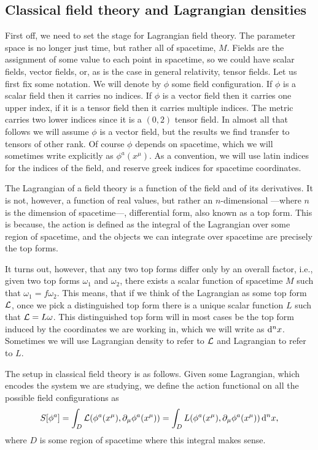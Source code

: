 \documentclass[../main.tex]{subfiles}
\begin{document}
\subsection{Classical field theory and Lagrangian densities}
First off, we need to set the stage for Lagrangian field theory. The parameter space is no
longer just time, but rather all of spacetime, \( M \). Fields are the assignment of some
value to each point in spacetime, so we could have scalar fields, vector fields, or, as is
the case in general relativity, tensor fields. Let us first fix some notation. We will
denote by \( \phi \) some field configuration. If \( \phi \) is a scalar field then it
carries no indices. If \( \phi \) is a vector field then it carries one upper index, if it is a
tensor field then it carries multiple indices. The metric carries two lower indices since
it is a \( (0,2) \) tensor field. In almost all that follows we will assume \( \phi \) is
a vector field, but the results we find transfer to tensors of other rank. Of
course \( \phi \) depends on spacetime, which we will sometimes write explicitly as \(
\phi^a(x^\mu) \). As a convention, we will use latin indices for the indices of the field,
and reserve greek indices for spacetime coordinates. 

The Lagrangian of a field theory is a function of the field and of its derivatives.
It is not, however, a function of real values, but rather an \( n \)-dimensional ---where
\( n \) is the dimension of spacetime---, differential form, also known as a top form.
This is because, the action is defined as the integral of the Lagrangian over some region
of spacetime, and the objects we can integrate over spacetime are precisely the top forms.

It turns out, however, that any two top forms differ only by an overall factor, i.e., given two
top forms \( \omega_1 \) and \( \omega_2 \), there exists a scalar function of spacetime
\( M \) such that \( \omega_1 = f\omega_2 \). This means, that if we think of the
Lagrangian as some top form \( \mathcal{L} \), once we pick a distinguished top form there is a
unique scalar function \( L \) such that \( \mathcal{L} = L \omega \). This distinguished top form
will in most cases be the top form induced by the coordinates we are working in, which we
will write as \( \mathrm{d}^nx \). Sometimes we will use Lagrangian density to refer to \( \mathcal{L} \)
and Lagrangian to refer to \( L \). 

The setup in classical field theory is as follows. Given some Lagrangian, which encodes
the system we are studying, we define the action functional on all the possible field
configurations as 
\begin{equation*}
	S[\phi^a] = \int_D \mathcal{L}(\phi^a(x^\mu), \partial_\mu \phi^a(x^\mu)) = \int_D
	L(\phi^a(x^\mu), \partial_\mu \phi^a(x^\mu)) \,\mathrm{d}^n x,
\end{equation*}
where \( D \) is some region of spacetime where this integral makes sense. 
\end{document}
